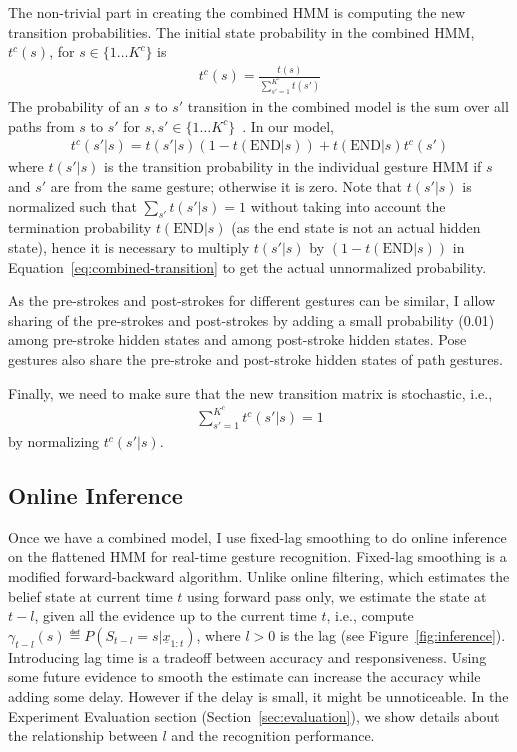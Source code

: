 The non-trivial part in creating the combined HMM is computing the new 
transition probabilities. The initial state probability in the combined
HMM, $t^c(s)$, for $s\in\{1\ldots K^c\}$ is
\begin{align*}
t^c(s) = \frac{t(s)}{\sum_{s'=1}^{K^c} t(s')}
\end{align*}
The probability of an $s$ to $s'$ transition
in the combined model is the sum over all paths from $s$ to
$s'$ for $s, s'\in\{1\ldots K^c\}$~\cite{murphy02}. In our model, 
\begin{align}
t^c(s'|s) = t(s' | s) (1-t(\text{END}|s)) +
t(\text{END}|s)t^c(s')
\label{eq:combined-transition}
\end{align}
where $t(s'|s)$ is the transition probability in the individual gesture HMM if
$s$ and $s'$ are from the same gesture; otherwise it is zero. Note that
$t(s'|s)$ is normalized such that $\sum_{s'}t(s'|s) = 1$ without taking into
account the termination probability $t(\text{END}|s)$ (as the end state is not
an actual hidden state), hence it is necessary to multiply $t(s'|s)$ by $
(1-t(\text{END}|s))$ in Equation~\ref{eq:combined-transition} to get the actual
unnormalized probability.

As the pre-strokes and post-strokes for different gestures can be similar, I
allow sharing of the pre-strokes and post-strokes by adding a small probability
(0.01) among pre-stroke hidden states and among post-stroke hidden states. Pose
gestures also share the pre-stroke and post-stroke hidden states of path
gestures.

Finally, we need to make sure that the new transition matrix is stochastic,
i.e., 
\begin{align*}
\sum_{s' = 1}^{K^c} t^c(s'|s) = 1
\end{align*}
by normalizing $t^c(s'|s)$.

\subsection{Online Inference}
Once we have a combined model, I use fixed-lag smoothing \cite{murphy02} to do
online inference on the flattened HMM for real-time gesture recognition.
Fixed-lag smoothing is a modified forward-backward algorithm. Unlike online
filtering, which estimates the belief state at current time $t$ using forward
pass only, we estimate the state at $t - l$, given all the evidence up to the
current time $t$, i.e., compute $\gamma_{t - l}(s) \eqdef P(S_{t -
l} = s|\underline{x}_{1:t})$, where $l > 0$ is the lag (see
Figure~\ref{fig:inference}).
Introducing lag time is a tradeoff between accuracy and responsiveness. Using some future evidence to
smooth the estimate can increase the accuracy while adding some delay. However
if the delay is small, it might be unnoticeable.
In the Experiment Evaluation section (Section~\ref{sec:evaluation}), we show
details about the relationship between $l$ and the recognition performance.

